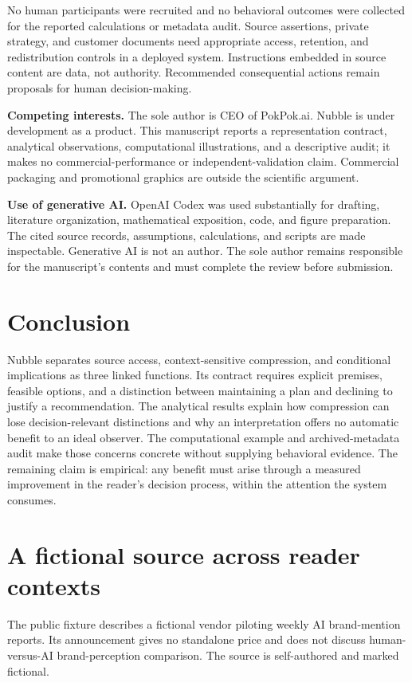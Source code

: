 \documentclass[11pt]{article}
\begin{document}
No human participants were recruited and no behavioral outcomes were collected for the reported calculations or metadata audit. Source assertions, private strategy, and customer documents need appropriate access, retention, and redistribution controls in a deployed system. Instructions embedded in source content are data, not authority. Recommended consequential actions remain proposals for human decision-making.

\textbf{Competing interests.} The sole author is CEO of PokPok.ai. Nubble is under development as a product. This manuscript reports a representation contract, analytical observations, computational illustrations, and a descriptive audit; it makes no commercial-performance or independent-validation claim. Commercial packaging and promotional graphics are outside the scientific argument.

\textbf{Use of generative AI.} OpenAI Codex was used substantially for drafting, literature organization, mathematical exposition, code, and figure preparation. The cited source records, assumptions, calculations, and scripts are made inspectable. Generative AI is not an author. The sole author remains responsible for the manuscript's contents and must complete the review before submission.

\section{Conclusion}

Nubble separates source access, context-sensitive compression, and conditional implications as three linked functions. Its contract requires explicit premises, feasible options, and a distinction between maintaining a plan and declining to justify a recommendation. The analytical results explain how compression can lose decision-relevant distinctions and why an interpretation offers no automatic benefit to an ideal observer. The computational example and archived-metadata audit make those concerns concrete without supplying behavioral evidence. The remaining claim is empirical: any benefit must arise through a measured improvement in the reader's decision process, within the attention the system consumes.

\appendix
\section{A fictional source across reader contexts}

The public fixture describes a fictional vendor piloting weekly AI brand-mention reports. Its announcement gives no standalone price and does not discuss human-versus-AI brand-perception comparison. The source is self-authored and marked fictional.
\end{document}

